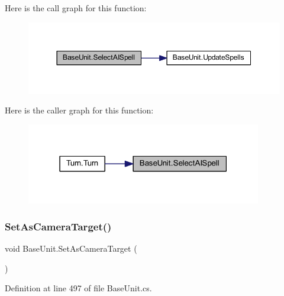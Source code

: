 Here is the call graph for this function\+:
\nopagebreak
\begin{figure}[H]
\begin{center}
\leavevmode
\includegraphics[width=350pt]{class_base_unit_a94ba01b61de9b22ba2431a47caf13cd5_cgraph}
\end{center}
\end{figure}
Here is the caller graph for this function\+:
\nopagebreak
\begin{figure}[H]
\begin{center}
\leavevmode
\includegraphics[width=291pt]{class_base_unit_a94ba01b61de9b22ba2431a47caf13cd5_icgraph}
\end{center}
\end{figure}
\mbox{\label{class_base_unit_ac4b2eaeb4641fc124d36d413b6193c56}} 
\subsubsection{\texorpdfstring{SetAsCameraTarget()}{SetAsCameraTarget()}}
{\footnotesize\ttfamily void Base\+Unit.\+Set\+As\+Camera\+Target (\begin{DoxyParamCaption}{ }\end{DoxyParamCaption})}



Definition at line 497 of file Base\+Unit.\+cs.

